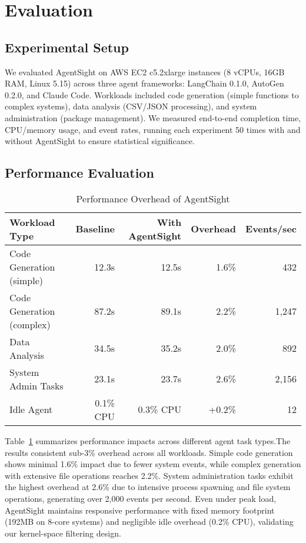 \section{Evaluation}

\subsection{Experimental Setup}

We evaluated AgentSight on AWS EC2 c5.2xlarge instances (8 vCPUs, 16GB RAM, Linux 5.15) across three agent frameworks: LangChain 0.1.0, AutoGen 0.2.0, and Claude Code. Workloads included code generation (simple functions to complex systems), data analysis (CSV/JSON processing), and system administration (package management). We measured end-to-end completion time, CPU/memory usage, and event rates, running each experiment 50 times with and without AgentSight to ensure statistical significance.

\subsection{Performance Evaluation}


\begin{table}[h]
\centering
\caption{Performance Overhead of AgentSight}
\label{tab:performance}
\begin{tabular}{lrrrr}
\toprule
Workload Type & Baseline & With AgentSight & Overhead & Events/sec \\
\midrule
Code Generation (simple) & 12.3s & 12.5s & 1.6\% & 432 \\
Code Generation (complex) & 87.2s & 89.1s & 2.2\% & 1,247 \\
Data Analysis & 34.5s & 35.2s & 2.0\% & 892 \\
System Admin Tasks & 23.1s & 23.7s & 2.6\% & 2,156 \\
Idle Agent & 0.1\% CPU & 0.3\% CPU & +0.2\% & 12 \\
\bottomrule
\end{tabular}
\end{table}

Table~\ref{tab:performance} summarizes performance impacts across different agent task types.The results consistent sub-3\% overhead across all workloads. Simple code generation shows minimal 1.6\% impact due to fewer system events, while complex generation with extensive file operations reaches 2.2\%. System administration tasks exhibit the highest overhead at 2.6\% due to intensive process spawning and file system operations, generating over 2,000 events per second. Even under peak load, AgentSight maintains responsive performance with fixed memory footprint (192MB on 8-core systems) and negligible idle overhead (0.2\% CPU), validating our kernel-space filtering design.

